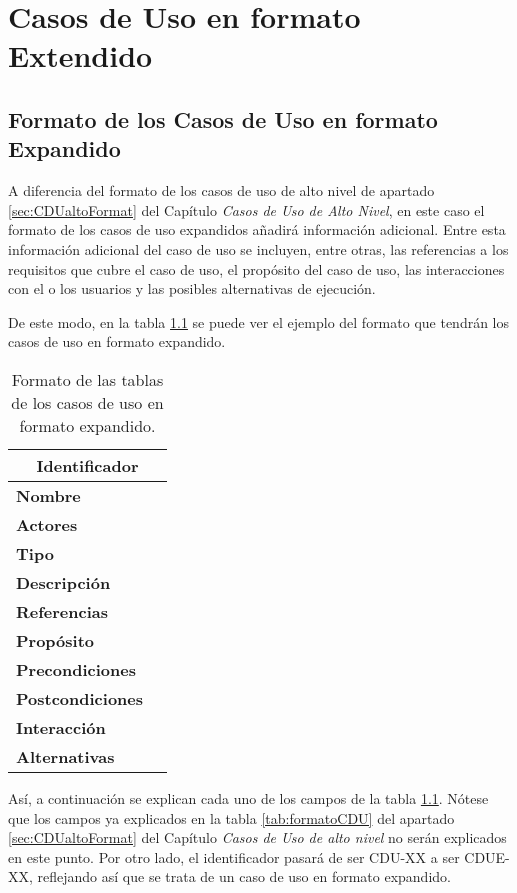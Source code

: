 \chapter{Casos de Uso en formato Extendido}
\section{Formato de los Casos de Uso en formato Expandido}
\par A diferencia del formato de los casos de uso de alto nivel de apartado \ref{sec:CDUaltoFormat} del Capítulo \textit{Casos de Uso de Alto Nivel}, en este caso el formato de los casos de uso expandidos añadirá información adicional. Entre esta información adicional del caso de uso se incluyen, entre otras, las referencias a los requisitos que cubre el caso de uso, el propósito del caso de uso, las interacciones con el o los usuarios y las posibles alternativas de ejecución.
\par De este modo, en la tabla \ref{tab:formatoCDUE} se puede ver el ejemplo del formato que tendrán los casos de uso en formato expandido.

\begin{table}[h]
\begin{center}
\begin{tabular}{p{} p{11cm}}
\multicolumn{2}{c}{\textbf{Identificador} } \\ \hline \hline
\textbf{Nombre} &  \\ \hline
\textbf{Actores} &  \\ \hline
\textbf{Tipo} & \\ \hline
\textbf{Descripción} &  \\ \hline
\textbf{Referencias} &  \\ \hline
\textbf{Propósito} &  \\ \hline
\textbf{Precondiciones} &  \\ \hline
\textbf{Postcondiciones} &  \\ \hline
\textbf{Interacción} &  \\ \hline
\textbf{Alternativas} &  \\ \hline
\end{tabular}
\caption{Formato de las tablas de los casos de uso en formato expandido.}
\label{tab:formatoCDUE}
\end{center}
\end{table}

\par Así, a continuación se explican cada uno de los campos de la tabla \ref{tab:formatoCDUE}. Nótese que los campos ya explicados en la tabla \ref{tab:formatoCDU} del apartado \ref{sec:CDUaltoFormat} del Capítulo \textit{Casos de Uso de alto nivel} no serán explicados en este punto. Por otro lado, el identificador pasará de ser CDU-XX a ser CDUE-XX, reflejando así que se trata de un caso de uso en formato expandido.

